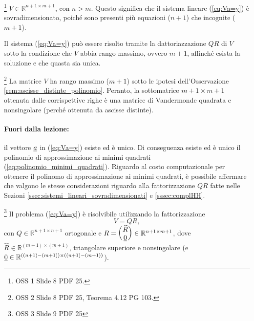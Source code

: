 \begin{remark}
    \footnote{OSS 1 Slide 8 PDF 25.}
    $V\in\mathbb R^{n+1\times m+1}$, con $n>m$. Questo significa che il sistema lineare (\ref{eq:Va=y}) è sovradimensionato, poiché sono presenti più equazioni ($n+1$) che incognite ($m+1$).
\end{remark}

\begin{remark}
	Il sistema (\ref{eq:Va=y}) può essere risolto tramite la dattoriazzazione $QR$ di $V$ sotto la condizione che $V$ abbia rango massimo, ovvero $m+1$, affinché esista la soluzione e che quasta sia unica.
\end{remark}

\begin{remark}
    \footnote{OSS 2 Slide 8 PDF 25, Teorema 4.12 PG 103.}
    La matrice $V$ ha rango massimo ($m+1$) sotto le ipotesi dell'Osservazione \ref{rem:ascisse_distinte_polinomio}. Peranto, la sottomatrice $m+1\times m+1$ ottenuta dalle corrispettive righe è una matrice di Vandermonde quadrata e nonsingolare (perché ottenuta da ascisse distinte).
\end{remark}

\paragraph{Fuori dalla lezione:} il vettore $\uline a$ in (\ref{eq:Va=y}) esiste ed è unico. Di conseguenza esiste ed è unico il polinomio di approssimazione ai minimi quadrati (\ref{eq:polinomio_minimi_quadrati}). Riguardo al costo computazionale per ottenere il polinomo di approssimazione ai minimi quadrati, è possibile affermare che valgono le stesse considerazioni riguardo alla fattorizzazione $QR$ fatte nelle Sezioni \ref{ssec:sistemi_lineari_sovradimensionati} e \ref{sssec:complHH}.

\begin{remark}
    \footnote{OSS 3 Slide 9 PDF 25} Il problema (\ref{eq:Va=y}) è risolvibile utilizzando la fattorizzazione
    \begin{equation*}
    	V=QR,
    \end{equation*}
    con $Q\in\mathbb R^{n+1\times n+1}$ ortogonale e $R=\begin{pmatrix}\widehat R\\ \uline 0\end{pmatrix}\in\mathbb R^{n+1\times m+1}$, dove $\widehat R\in\mathbb R^{(m+1)\times (m+1)}$, triangolare superiore e nonsingolare (e $\uline 0 \in \mathbb{R}^{((n+1)-(m+1))\times ((n+1)-(m+1))}$).
\end{remark}

